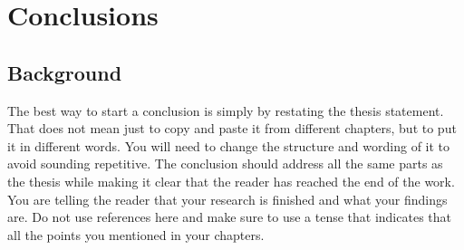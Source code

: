 \chapter{Conclusions}
\label{chap:chap6}

\section{Background}
\label{sec:chap5sec1}
The best way to start a conclusion is simply by restating the thesis statement. That does not mean just to copy and paste it from different chapters, but to put it in different words. You will need to change the structure and wording of it to avoid sounding repetitive. The conclusion should address all the same parts as the thesis while making it clear that the reader has reached the end of the work. You are telling the reader that your research is finished and what your findings are. Do not use references here and make sure to use a tense that indicates that all the points you mentioned in your chapters.

\clearpage %
